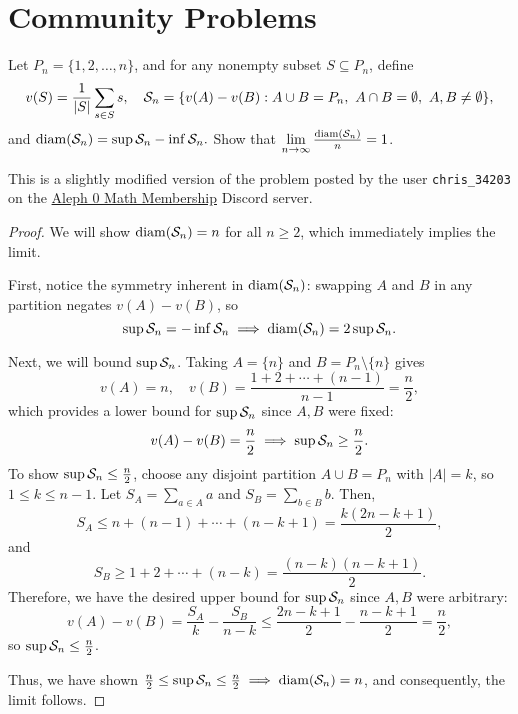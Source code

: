 \section{Community Problems}

\begin{problem}
  Let $P_{n} = \{ 1, 2, \dots, n \}$, and for any nonempty subset $S \subseteq P_{n}$, define
  \[
    v(S) = \dfrac{1}{\left\lvert S \right\rvert} \sum_{s \in S} s, \quad \mathcal{S}_{n} = \{ v(A) - v(B) : A \cup B = P_n,\ A \cap B = \emptyset,\ A, B \neq \emptyset \},
  \]
  and $\operatorname{diam}(\mathcal{S}_{n}) = \sup \mathcal{S}_{n} - \inf \mathcal{S}_{n}.$
  Show that $\lim\limits_{n \to \infty} \frac{\operatorname{diam}(\mathcal{S}_{n})}{n} = 1$.

  \begin{callout}[Note]
    This is a slightly modified version of the problem posted by the user \texttt{chris\_34203}
    on the \href{https://discord.com/channels/1381996954237800608/1381996954673745932/1393174128432906357}{Aleph 0 Math Membership} Discord server.
  \end{callout}

\end{problem}

\begin{proof}
  We will show $\operatorname{diam}(\mathcal{S}_{n}) = n$ for all $n \ge 2$, which immediately implies the limit.

  First, notice the symmetry inherent in $\operatorname{diam}(\mathcal{S}_{n})$: swapping $A$ and $B$ in any partition negates $v(A)-v(B)$, so
  \[
    \sup \mathcal{S}_{n} = -\inf \mathcal{S}_{n} \implies \operatorname{diam}(\mathcal{S}_{n}) = 2\sup \mathcal{S}_{n}.
  \]

  Next, we will bound $\sup \mathcal{S}_{n}$. Taking $A = \{ n \}$ and $B = P_n \setminus \{ n \}$ gives
  \[
    v(A) = n, \quad v(B) = \frac{1 + 2 + \cdots + (n-1)}{n - 1} = \frac{n}{2},
  \]
  which provides a lower bound for $\sup \mathcal{S}_{n}$ since $A, B$ were fixed:
  \[
    v(A) - v(B) = \frac{n}{2} \implies \sup \mathcal{S}_{n} \ge \frac{n}{2}.
  \]
  To show $\sup \mathcal{S}_{n} \le \frac{n}{2}$, choose any disjoint partition $A \cup B = P_{n}$ with $|A| = k$, so $1 \le k \le n - 1$.
  Let $S_A = \sum_{a \in A} a$ and $S_B = \sum_{b \in B} b$. Then,
  \[
    S_{A} \le n + (n-1) + \cdots + (n - k + 1) = \frac{k(2n - k + 1)}{2},
  \]
  and
  \[
    S_{B} \ge 1 + 2 + \cdots + (n - k) = \frac{(n - k)(n - k + 1)}{2}.
  \]
  Therefore, we have the desired upper bound for $\sup \mathcal{S}_{n}$ since $A, B$ were arbitrary:
  \[
    v(A) - v(B) = \frac{S_A}{k} - \frac{S_B}{n - k} \le \frac{2n - k + 1}{2} - \frac{n - k + 1}{2} = \frac{n}{2},
  \]
  so $\sup \mathcal{S}_{n} \le \frac{n}{2}$. 

  Thus, we have shown $\frac{n}{2} \leq \sup \mathcal{S}_{n} \leq \frac{n}{2} \implies \operatorname{diam}(\mathcal{S}_{n}) = n$, and consequently,
  the limit follows.
\end{proof}
